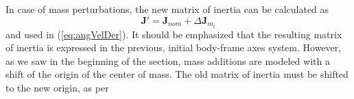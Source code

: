 
In case of mass perturbations, the new matrix of inertia can be calculated as
%
\begin{equation}
	\bm{J}' = \bm{J}_{nom} + \Delta\bm{J}_{m_i}
\end{equation}
%
and used in (\ref{eq:angVelDer}). It should be emphasized that the resulting matrix of inertia is expressed in the previous, initial body-frame axes system. However, as we saw in the beginning of the section, mass additions are modeled with a shift of the origin of the center of mass. The old matrix of inertia must be shifted to the new origin, as per \cite{Peraire2008}

